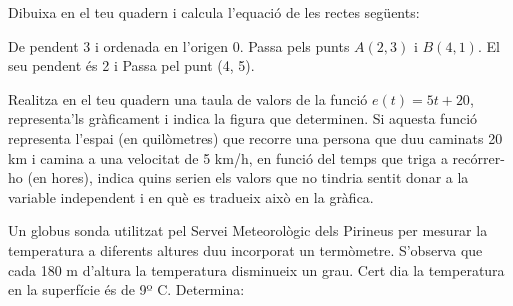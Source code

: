 \begin{mylist}
\answers{[$y=2x+3$, $y=-x+4$, $y=0$, $y=-2x+1$]}	
	
	\exer  Dibuixa en el teu quadern i calcula l'equació de les rectes següents:
	\begin{tasks}
		\task   De pendent 3 i ordenada en l'origen 0.
		\task   Passa pels punts $A( 2, 3)$ i $B(4, 1)$.
		\task   El seu pendent és 2 i Passa  pel punt (4, 5).
	\end{tasks}
	
\answers{[$y=3x$, $y=-x+5$, $y=2x-3$]}
	
	
\exer  Realitza en el teu quadern una taula de valors de la funció $e(\textit{t}) = 5\textit{t} + 20$, representa'ls gràficament i indica la figura que determinen. Si aquesta funció representa l'espai (en quilòmetres) que recorre una persona que duu caminats 20 km i camina a una velocitat de 5 km/h, en funció del temps que triga a recórrer-ho (en hores), indica quins serien els valors que no tindria sentit donar a la variable independent i en què es tradueix això en la gràfica. 
 
 
 
 \vspace{-4.5cm}
 \exer \begin{minipage}[t]{0.82\textwidth}
 	Un globus sonda utilitzat pel Servei Meteorològic dels Pirineus per mesurar la temperatura a diferents altures duu incorporat un termòmetre. S'observa que cada 180 m d'altura la temperatura disminueix un grau. Cert dia la temperatura en la superfície és de 9º C. Determina:\vspace{0.2cm}
 	

\end{minipage}
\end{mylist}
